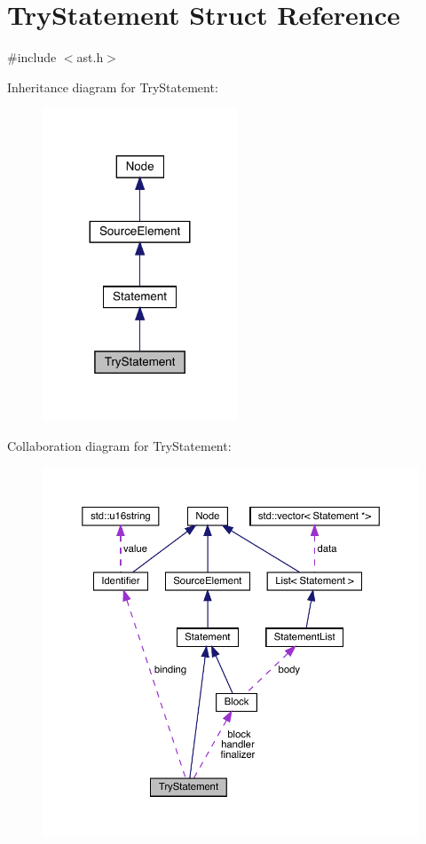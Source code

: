 \hypertarget{struct_try_statement}{}\section{Try\+Statement Struct Reference}
\label{struct_try_statement}


{\ttfamily \#include $<$ast.\+h$>$}



Inheritance diagram for Try\+Statement\+:\nopagebreak
\begin{figure}[H]
\begin{center}
\leavevmode
\includegraphics[width=164pt]{struct_try_statement__inherit__graph}
\end{center}
\end{figure}


Collaboration diagram for Try\+Statement\+:
\nopagebreak
\begin{figure}[H]
\begin{center}
\leavevmode
\includegraphics[width=350pt]{struct_try_statement__coll__graph}
\end{center}
\end{figure}
